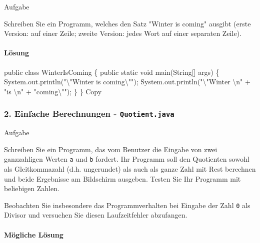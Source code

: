 \documentclass[
]{article}
\newenvironment{Shaded}{}{}
\newcommand{\NormalTok}[1]{#1}
\begin{document}
Aufgabe

Schreiben Sie ein Programm, welches den Satz "Winter is coming" ausgibt
(erste Version: auf einer Zeile; zweite Version: jedes Wort auf einer
separaten Zeile).

\paragraph{Lösung}\label{luxf6sung-6}

\begin{Shaded}
\begin{Highlighting}[]
\NormalTok{public class WinterIsComing \{}
\NormalTok{    public static void main(String[] args) \{}
\NormalTok{        System.out.println("\textbackslash{}"Winter is coming\textbackslash{}"");}
\NormalTok{        System.out.println("\textbackslash{}"Winter \textbackslash{}n" +}
\NormalTok{                "is \textbackslash{}n" +}
\NormalTok{                "coming\textbackslash{}"");}
\NormalTok{    \}}
\NormalTok{\}}
\NormalTok{Copy}
\end{Highlighting}
\end{Shaded}

\subsubsection{\texorpdfstring{2. Einfache Berechnungen -
\texttt{Quotient.java}}{2. Einfache Berechnungen - Quotient.java}}\label{einfache-berechnungen---quotient.java}

Aufgabe

Schreiben Sie ein Programm, das vom Benutzer die Eingabe von zwei
ganzzahligen Werten \texttt{a} und \texttt{b} fordert. Ihr Programm soll
den Quotienten {} sowohl als Gleitkommazahl (d.h. ungerundet) als auch
als ganze Zahl mit Rest berechnen und beide Ergebnisse am Bildschirm
ausgeben. Testen Sie Ihr Programm mit beliebigen Zahlen.

Beobachten Sie insbesondere das Programmverhalten bei Eingabe der Zahl
\texttt{0} als Divisor und versuchen Sie diesen Laufzeitfehler
abzufangen.

\paragraph{Mögliche Lösung}\label{muxf6gliche-luxf6sung-1}
\end{document}
